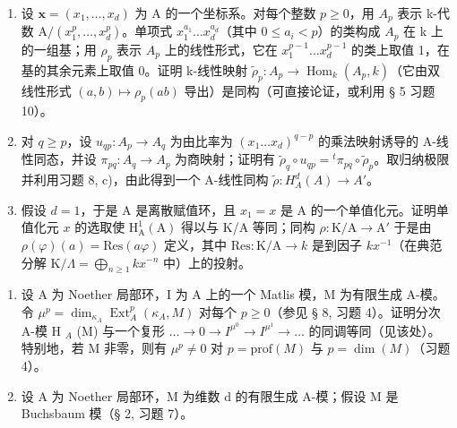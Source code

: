 \begin{enumerate}
\def\labelenumi{\alph{enumi})}
\item
  设 \(\mathbf{x} = (x_{1}, \ldots, x_{d})\) 为 A 的一个坐标系。对每个整数 \(p \geqslant 0\)，用 \(A_{p}\) 表示 k-代数 \(\mathrm{A}/(x_{1}^{p}, \ldots, x_{d}^{p})\)。单项式 \(x_{1}^{a_{1}} \ldots x_{d}^{a_{d}}\)（其中 \(0 \leqslant a_{i} < p\)）的类构成 \(A_{p}\) 在 k 上的一组基；用 \(\rho_{p}\) 表示 \(A_{p}\) 上的线性形式，它在 \(x_{1}^{p-1} \ldots x_{d}^{p-1}\) 的类上取值 1，在基的其余元素上取值 0。证明 k-线性映射 \(\tilde{\rho}_{p}: A_{p} \to \operatorname{Hom}_{k}(A_{p}, k)\)（它由双线性形式 \((a, b) \mapsto \rho_{p}(ab)\) 导出）是同构（可直接论证，或利用 § 5 习题 10）。
\item
  对 \(q \geqslant p\)，设 \(u_{qp}: A_p \to A_q\) 为由比率为 \((x_1 \ldots x_d)^{q-p}\) 的乘法映射诱导的 A-线性同态，并设 \(\pi_{pq}: A_q \to A_p\) 为商映射；证明有 \(\tilde{\rho}_q \circ u_{qp} = {}^t \pi_{pq} \circ \tilde{\rho}_p\)。取归纳极限并利用习题 8, c)，由此得到一个 A-线性同构 \(\tilde{\rho}: H_A^d(A) \to A'\)。
\item
  假设 \(d=1\)，于是 A 是离散赋值环，且 \(x_{1}=x\) 是 A 的一个单值化元。证明单值化元 \(x\) 的选取使 \(\mathrm{H}_{\mathrm{A}}^{1}(\mathrm{A})\) 得以与 K/A 等同；同构 \(\rho:\mathrm{K}/\mathrm{A}\to\mathrm{A}'\) 于是由 \(\rho(\varphi)(a)=\mathrm{Res}(a\varphi)\) 定义，其中 \(\mathrm{Res}:\mathrm{K}/\mathrm{A}\to k\) 是到因子 \(k x^{-1}\)（在典范分解 \(\mathrm{K}/\Lambda=\bigoplus_{n\geqslant 1}k x^{-n}\) 中）上的投射。
\end{enumerate}

\begin{enumerate}
\def\labelenumi{\arabic{enumi})}
\setcounter{enumi}{10}
\item
  设 A 为 Noether 局部环，I 为 A 上的一个 Matlis 模，M 为有限生成 A-模。令 \(\mu^{p} = \dim_{\kappa_{A}} \operatorname{Ext}_{A}^{p}(\kappa_{A}, M)\) 对每个 \(p \geqslant 0\)（参见 § 8, 习题 4）。证明分次 A-模 H \(_{A}\) (M) 与一个复形 \(\ldots \to 0 \to I^{\mu^{0}} \to I^{\mu^{1}} \to \ldots\) 的同调等同（见该处）。特别地，若 M 非零，则有 \(\mu^{p} \neq 0\) 对 \(p = \text{prof}(M)\) 与 \(p = \dim(M)\)（习题 4）。
\item
  设 A 为 Noether 局部环，M 为维数 d 的有限生成 A-模；假设 M 是 Buchsbaum 模（§ 2, 习题 7）。
\end{enumerate}

